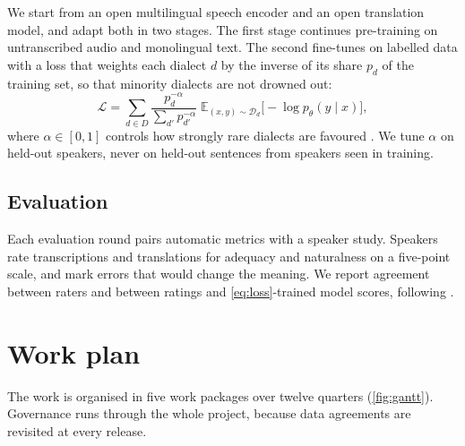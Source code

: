 \documentclass[11pt]{article}
\begin{document}
We start from an open multilingual speech encoder and an open translation
model, and adapt both in two stages. The first stage continues pre-training on
untranscribed audio and monolingual text. The second fine-tunes on labelled
data with a loss that weights each dialect $d$ by the inverse of its share
$p_d$ of the training set, so that minority dialects are not drowned out:
\begin{equation}\label{eq:loss}
  \mathcal{L} = \sum_{d \in D} \frac{p_d^{-\alpha}}{\sum_{d'} p_{d'}^{-\alpha}}
  \; \mathbb{E}_{(x,y) \sim \mathcal{D}_d} \bigl[ -\log p_\theta(y \mid x) \bigr],
\end{equation}
where $\alpha \in [0,1]$ controls how strongly rare dialects are favoured
\parencite{arivazhagan2019massively}. We tune $\alpha$ on held-out speakers,
never on held-out sentences from speakers seen in training.

\subsection{Evaluation}

Each evaluation round pairs automatic metrics with a speaker study. Speakers
rate transcriptions and translations for adequacy and naturalness on a
five-point scale, and mark errors that would change the meaning. We report
agreement between raters and between ratings and \cref{eq:loss}-trained model
scores, following \textcite{mendoza2024metrics}.

\section{Work plan}\label{sec:workplan}

The work is organised in five work packages over twelve quarters
(\cref{fig:gantt}). Governance runs through the whole project, because data
agreements are revisited at every release.
\end{document}
